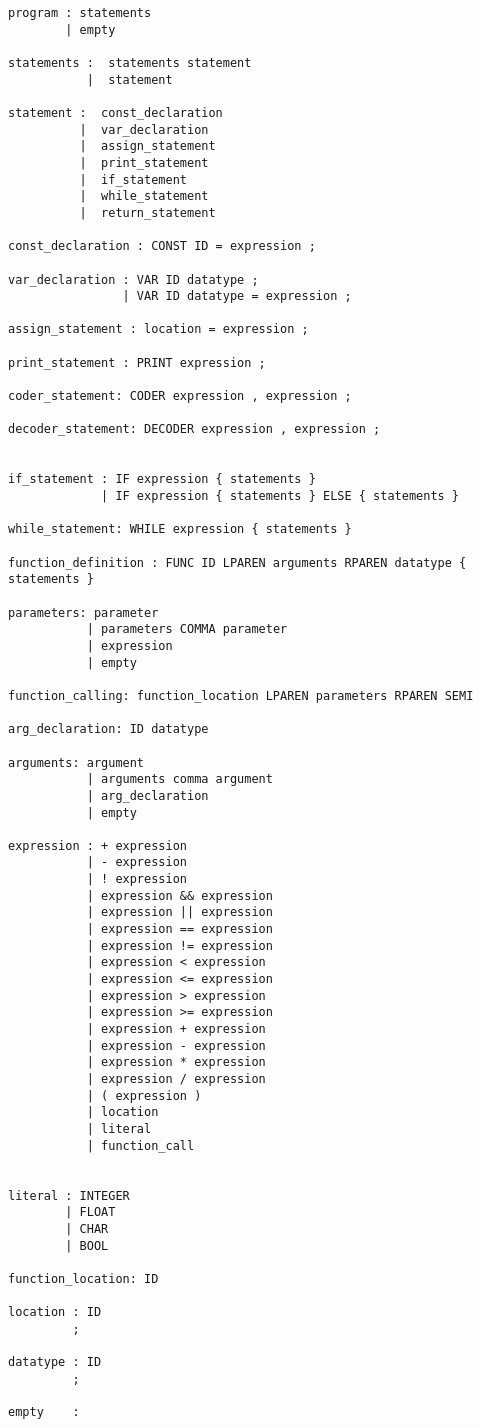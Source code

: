 \begin{lstlisting}[style=pythonStyle]
program : statements
        | empty

statements :  statements statement
           |  statement

statement :  const_declaration
          |  var_declaration
          |  assign_statement
          |  print_statement
          |  if_statement
          |  while_statement
          |  return_statement

const_declaration : CONST ID = expression ;

var_declaration : VAR ID datatype ;
                | VAR ID datatype = expression ;

assign_statement : location = expression ;

print_statement : PRINT expression ;

coder_statement: CODER expression , expression ;

decoder_statement: DECODER expression , expression ;


if_statement : IF expression { statements }
             | IF expression { statements } ELSE { statements }
             
while_statement: WHILE expression { statements }

function_definition : FUNC ID LPAREN arguments RPAREN datatype { statements }

parameters: parameter
           | parameters COMMA parameter
           | expression
           | empty

function_calling: function_location LPAREN parameters RPAREN SEMI

arg_declaration: ID datatype

arguments: argument
           | arguments comma argument
           | arg_declaration
           | empty

expression : + expression
           | - expression
           | ! expression
           | expression && expression
           | expression || expression
           | expression == expression
           | expression != expression
           | expression < expression
           | expression <= expression
           | expression > expression
           | expression >= expression
           | expression + expression
           | expression - expression
           | expression * expression           
           | expression / expression
           | ( expression )
           | location
           | literal
           | function_call
               

literal : INTEGER     
        | FLOAT       
        | CHAR     
        | BOOL 

function_location: ID

location : ID
         ;

datatype : ID
         ;

empty    :
\end{lstlisting}


